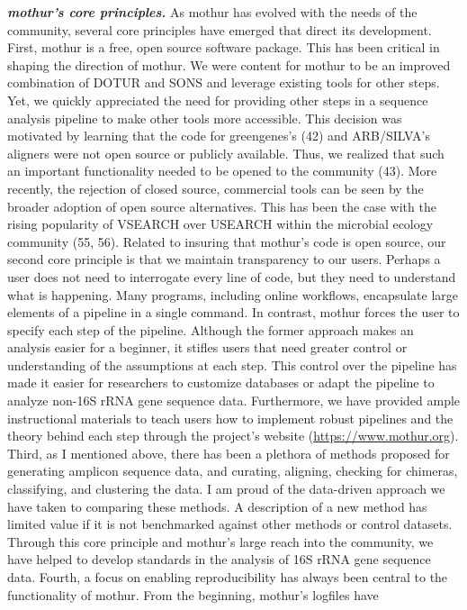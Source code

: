 \documentclass[11pt,]{article}
\begin{document}
\textbf{\emph{mothur's core principles.}} As mothur has evolved with the
needs of the community, several core principles have emerged that direct
its development. First, mothur is a free, open source software package.
This has been critical in shaping the direction of mothur. We were
content for mothur to be an improved combination of DOTUR and SONS and
leverage existing tools for other steps. Yet, we quickly appreciated the
need for providing other steps in a sequence analysis pipeline to make
other tools more accessible. This decision was motivated by learning
that the code for greengenes's (42) and ARB/SILVA's aligners were not
open source or publicly available. Thus, we realized that such an
important functionality needed to be opened to the community (43). More
recently, the rejection of closed source, commercial tools can be seen
by the broader adoption of open source alternatives. This has been the
case with the rising popularity of VSEARCH over USEARCH within the
microbial ecology community (55, 56). Related to insuring that mothur's
code is open source, our second core principle is that we maintain
transparency to our users. Perhaps a user does not need to interrogate
every line of code, but they need to understand what is happening. Many
programs, including online workflows, encapsulate large elements of a
pipeline in a single command. In contrast, mothur forces the user to
specify each step of the pipeline. Although the former approach makes an
analysis easier for a beginner, it stifles users that need greater
control or understanding of the assumptions at each step. This control
over the pipeline has made it easier for researchers to customize
databases or adapt the pipeline to analyze non-16S rRNA gene sequence
data. Furthermore, we have provided ample instructional materials to
teach users how to implement robust pipelines and the theory behind each
step through the project's website (\url{https://www.mothur.org}).
Third, as I mentioned above, there has been a plethora of methods
proposed for generating amplicon sequence data, and curating, aligning,
checking for chimeras, classifying, and clustering the data. I am proud
of the data-driven approach we have taken to comparing these methods. A
description of a new method has limited value if it is not benchmarked
against other methods or control datasets. Through this core principle
and mothur's large reach into the community, we have helped to develop
standards in the analysis of 16S rRNA gene sequence data. Fourth, a
focus on enabling reproducibility has always been central to the
functionality of mothur. From the beginning, mothur's logfiles have
\end{document}
